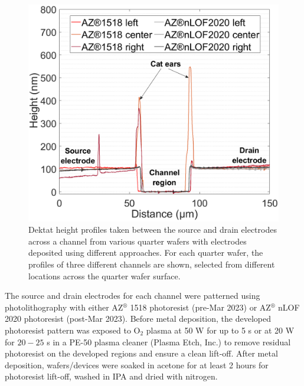 \documentclass[
  letterpaper,
  DIV=11,
  numbers=noendperiod]{scrartcl}
\begin{document}
\begin{figure}
\begin{minipage}[t]{0.47\linewidth}
{{\includegraphics{figures/ch4/dektat_1518nlof_profile_comparison.png}

}

}

\end{minipage}%

\caption{\label{fig-electrodes-dektat}Dektat height profiles taken
between the source and drain electrodes across a channel from various
quarter wafers with electrodes deposited using different approaches. For
each quarter wafer, the profiles of three different channels are shown,
selected from different locations across the quarter wafer surface.}

\end{figure}

The source and drain electrodes for each channel were patterned using
photolithography with either AZ\(^\circledR\) 1518 photoresist (pre-Mar
2023) or AZ\(^\circledR\) nLOF 2020 photoresist (post-Mar 2023). Before
metal deposition, the developed photoresist pattern was exposed to
O\(_2\) plasma at 50 W for up to 5 s or at 20 W for \(20-25\) s in a
PE-50 plasma cleaner (Plasma Etch, Inc.) to remove residual photoresist
on the developed regions and ensure a clean lift-off. After metal
deposition, wafers/devices were soaked in acetone for at least 2 hours
for photoresist lift-off, washed in IPA and dried with nitrogen.
\end{document}
